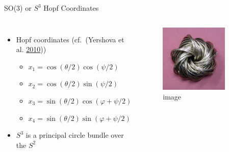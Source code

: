 \begin{frame}{SO(3) or \(S^3\) Hopf Coordinates}
\protect\hypertarget{so3-or-s3-hopf-coordinates}{}

\begin{columns}


\begin{itemize}
\item
  Hopf coordinates (cf.~(Yershova et al.
  \protect\hyperlink{ref-yershova2010generating}{2010}))

  \begin{itemize}
  \item
    \(x_1 = \cos(\theta/2) \cos(\psi/2)\)
  \item
    \(x_2 = \cos(\theta/2) \sin(\psi/2)\)
  \item
    \(x_3 = \sin(\theta/2) \cos(\varphi + \psi/2)\)
  \item
    \(x_4 = \sin(\theta/2) \sin(\varphi + \psi/2)\)
  \end{itemize}
\item
  \(S^3\) is a principal circle bundle over the \(S^2\)
\end{itemize}


\begin{figure}
\centering
\includegraphics[width=0.8\textwidth,height=\textheight]{Hopfkeyrings.jpg}
\caption{image}
\end{figure}

\end{columns}

\end{frame}

